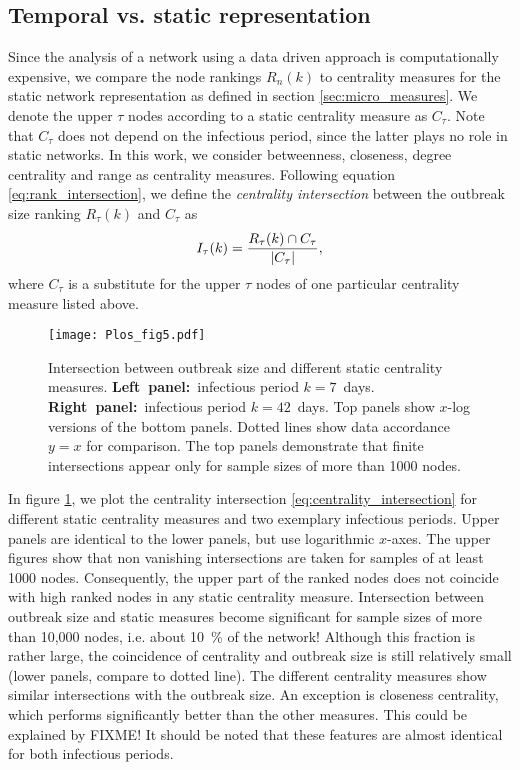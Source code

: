 \subsection{Temporal vs. static representation}
Since the analysis of a network using a data driven approach is computationally expensive, we compare the node rankings $R_n(k)$ to centrality measures for the static network representation as defined in section \ref{sec:micro_measures}.
We denote the upper $\tau $ nodes according to a static centrality measure as $C_\tau $.
Note that $C_\tau $ does not depend on the infectious period, since the latter plays no role in static networks.
In this work, we consider betweenness, closeness, degree centrality and range as centrality measures.
Following equation \eqref{eq:rank_intersection}, we define the \emph{centrality intersection} between the outbreak size ranking $R_\tau (k)$ and $C_\tau $ as
\begin{equation}\label{eq:centrality_intersection}
I_\tau (k)=\frac{R_\tau (k) \cap C_\tau}{\left| C_\tau \right|},
\end{equation}
where $C_\tau $ is a substitute for the upper $\tau $ nodes of one particular centrality measure listed above.
%
\begin{figure}[htbp]
\begin{center}
\texttt{[image: Plos\_fig5.pdf]}
\caption{Intersection between outbreak size and different static centrality measures.
\textbf{Left~panel:}~infectious period $k=7$~days.
\textbf{Right~panel:}~infectious period $k=42$~days.
Top panels show $x$-log versions of the bottom panels. 
Dotted lines show data accordance $y=x$ for comparison.
The top panels demonstrate that finite intersections appear only for sample sizes of more than 1000 nodes.}
\label{fig:plos_fig5}
\end{center}
\end{figure}

In figure \ref{fig:plos_fig5}, we plot the centrality intersection \eqref{eq:centrality_intersection} for different static centrality measures and two exemplary infectious periods.
Upper panels are identical to the lower panels, but use logarithmic $x$-axes. 
The upper figures show that non vanishing intersections are taken for samples of at least 1000 nodes.
Consequently, the upper part of the ranked nodes does not coincide with high ranked nodes in any static centrality measure.
Intersection between outbreak size and static measures become significant for sample sizes of more than 10,000 nodes, i.e. about 10~\% of the network!
Although this fraction is rather large, the coincidence of centrality and outbreak size is still relatively small (lower panels, compare to dotted line).
The different centrality measures show similar intersections with the outbreak size.
An exception is closeness centrality, which performs significantly better than the other measures.
This could be explained by FIXME!
It should be noted that these features are almost identical for both infectious periods.

